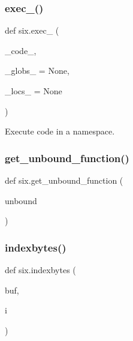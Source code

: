 \subsubsection{\texorpdfstring{exec\+\_\+()}{exec\_()}}
{\footnotesize\ttfamily def six.\+exec\+\_\+ (\begin{DoxyParamCaption}\item[{}]{\+\_\+code\+\_\+,  }\item[{}]{\+\_\+globs\+\_\+ = {\ttfamily None},  }\item[{}]{\+\_\+locs\+\_\+ = {\ttfamily None} }\end{DoxyParamCaption})}

\begin{DoxyVerb}Execute code in a namespace.\end{DoxyVerb}
 \mbox{\label{namespacesix_a7fdefd36b1e0348ef236a3b06cb104c0}} 
\subsubsection{\texorpdfstring{get\+\_\+unbound\+\_\+function()}{get\_unbound\_function()}}
{\footnotesize\ttfamily def six.\+get\+\_\+unbound\+\_\+function (\begin{DoxyParamCaption}\item[{}]{unbound }\end{DoxyParamCaption})}

\mbox{\label{namespacesix_adc76be2a046073fafe57d52e5ec84775}} 
\subsubsection{\texorpdfstring{indexbytes()}{indexbytes()}}
{\footnotesize\ttfamily def six.\+indexbytes (\begin{DoxyParamCaption}\item[{}]{buf,  }\item[{}]{i }\end{DoxyParamCaption})}

\mbox{\label{namespacesix_a9577ea8bb177f2b6ad9abf0a289dcccd}} 
